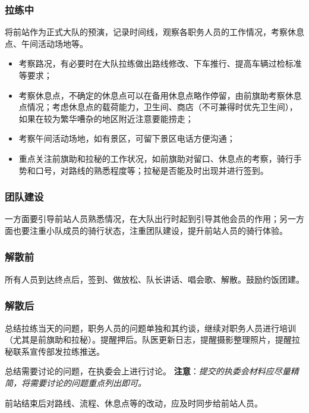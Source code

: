 \documentclass[UTF8]{ctexart}
\begin{document}
\subsubsection{拉练中}

将前站作为正式大队的预演，记录时间线，观察各职务人员的工作情况，考察休息点、午间活动场地等。

\begin{itemize}[nosep,left=4em]
    \item 考察路况，有必要时在大队拉练做出路线修改、下车推行、提高车辆过检标准等要求；
    \item 考察休息点，不确定的休息点可以在备用休息点略作停留，由前旗助考察休息点情况；考虑休息点的载荷能力，卫生间、商店（不可兼得时优先卫生间），如果在较为繁华嘈杂的地区附近注意要能捞走；
    \item 考察午间活动场地，如有景区，可留下景区电话方便沟通；
    \item 重点关注前旗助和拉秘的工作状况，如前旗助对留口、休息点的考察，骑行手势和口号，对路线的熟悉程度等；拉秘是否能及时出现并进行签到。
\end{itemize}

\subsubsection{团队建设}

一方面要引导前站人员熟悉情况，在大队出行时起到引导其他会员的作用；另一方面也要注重小队成员的骑行状态，注重团队建设，提升前站人员的骑行体验。

\subsubsection{解散前}

所有人员到达终点后，签到、做放松、队长讲话、唱会歌、解散。鼓励约饭团建。

\subsubsection{解散后}

总结拉练当天的问题，职务人员的问题单独和其约谈，继续对职务人员进行培训（尤其是前旗助和拉秘）。提醒押后。队医更新日志，提醒摄影整理照片，提醒拉秘联系宣传部发拉练推送。

总结需要讨论的问题，在执委会上进行讨论。
\textbf{注意}：\textit{提交的执委会材料应尽量精简，将需要讨论的问题重点列出即可。}

前站结束后对路线、流程、休息点等的改动，应及时同步给前站人员。
\end{document}
